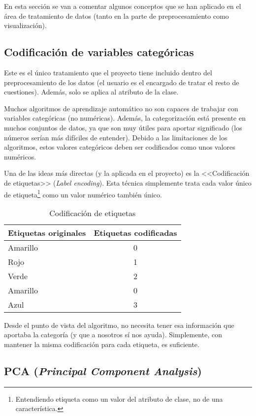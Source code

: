 En esta sección se van a comentar algunos conceptos que se han aplicado en el
área de tratamiento de datos (tanto en la parte de preprocesamiento como
visualización).

\subsection{Codificación de variables categóricas}
Este es el único tratamiento que el proyecto tiene incluido dentro del
preprocesamiento de los datos (el usuario es el encargado de tratar el resto de
cuestiones). Además, solo se aplica al atributo de la clase.

Muchos algoritmos de aprendizaje automático no son capaces de trabajar con
variables categóricas (no numéricas). Además, la categorización está presente en
muchos conjuntos de datos, ya que son muy útiles para aportar significado (los
números serían más difíciles de entender). Debido a las limitaciones de los
algoritmos, estos valores categóricos deben ser codificados como unos valores
numéricos.

Una de las ideas más directas (y la aplicada en el proyecto) es la
<<Codificación de etiquetas>> (\textit{Label encoding}). Esta técnica
simplemente trata cada valor único de etiqueta\footnote{Entendiendo etiqueta
como un valor del atributo de clase, no de una característica.} como un valor
numérico también único.

\begin{table}[H]
    \centering
\begin{tabular}{l|c}
Etiquetas originales & Etiquetas codificadas \\ \hline
Amarillo             & 0                     \\
Rojo                 & 1                     \\
Verde                & 2                     \\
Amarillo             & 0                     \\
Azul                 & 3                    
\end{tabular}
\caption{Codificación de etiquetas}
\end{table}

Desde el punto de vista del algoritmo, no necesita tener esa información que
aportaba la categoría (y que a nosotros sí nos ayuda). Simplemente, con mantener
la misma codificación para cada etiqueta, es suficiente.

\subsection{PCA (\textit{Principal Component Analysis})} 


